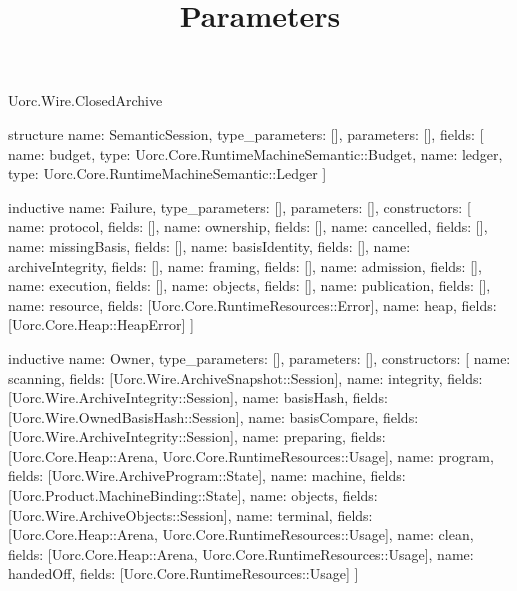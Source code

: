 \begin{lexlean}{Uorc.Wire.ClosedArchive}
\title{Parameters}
\begin{semanticmodule}
structure{
  name: SemanticSession,
  type_parameters: [],
  parameters: [],
  fields: [
    {name: budget, type: Uorc.Core.RuntimeMachineSemantic::Budget},
    {name: ledger, type: Uorc.Core.RuntimeMachineSemantic::Ledger}
  ]
}

inductive{
  name: Failure,
  type_parameters: [],
  parameters: [],
  constructors: [
    {name: protocol, fields: []},
    {name: ownership, fields: []},
    {name: cancelled, fields: []},
    {name: missingBasis, fields: []},
    {name: basisIdentity, fields: []},
    {name: archiveIntegrity, fields: []},
    {name: framing, fields: []},
    {name: admission, fields: []},
    {name: execution, fields: []},
    {name: objects, fields: []},
    {name: publication, fields: []},
    {name: resource, fields: [Uorc.Core.RuntimeResources::Error]},
    {name: heap, fields: [Uorc.Core.Heap::HeapError]}
  ]
}

inductive{
  name: Owner,
  type_parameters: [],
  parameters: [],
  constructors: [
    {name: scanning, fields: [Uorc.Wire.ArchiveSnapshot::Session]},
    {name: integrity, fields: [Uorc.Wire.ArchiveIntegrity::Session]},
    {name: basisHash, fields: [Uorc.Wire.OwnedBasisHash::Session]},
    {name: basisCompare, fields: [Uorc.Wire.ArchiveIntegrity::Session]},
    {name: preparing, fields: [Uorc.Core.Heap::Arena, Uorc.Core.RuntimeResources::Usage]},
    {name: program, fields: [Uorc.Wire.ArchiveProgram::State]},
    {name: machine, fields: [Uorc.Product.MachineBinding::State]},
    {name: objects, fields: [Uorc.Wire.ArchiveObjects::Session]},
    {name: terminal, fields: [Uorc.Core.Heap::Arena, Uorc.Core.RuntimeResources::Usage]},
    {name: clean, fields: [Uorc.Core.Heap::Arena, Uorc.Core.RuntimeResources::Usage]},
    {name: handedOff, fields: [Uorc.Core.RuntimeResources::Usage]}
  ]
}


\end{semanticmodule}
\end{lexlean}
